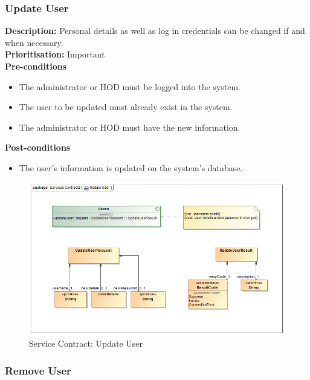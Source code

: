 \documentclass[a4paper]{article}
\begin{document}
        
        \pagebreak
    \subsubsection{Update User}
       
        \textbf{Description:} Personal details as well as log in credentials can be changed if and when necessary.\\
         \textbf{Prioritisation:} Important\\
         
        \textbf{Pre-conditions}
         \begin{itemize}
            \item The administrator or HOD must be logged into the system.
            \item The user to be updated must already exist in the system.
            \item The administrator or HOD must have the new information.
       \end{itemize}
        
        \textbf{Post-conditions}
        \begin{itemize}
            \item The user's information is updated on the system's database.
        \end{itemize}
        
            	\begin{figure}[H]
            		\centering
            		\includegraphics[width=\textwidth]{../Assignment1/5.1.3.Update.User.Services.Contract.png}
            		\caption{Service Contract: Update User}
            	\end{figure}
        \pagebreak
    \subsubsection{Remove User}
        
\end{document}
